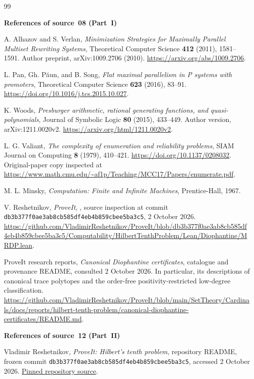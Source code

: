 \documentclass[11pt,letterpaper]{article}
\theoremstyle{definition}
\theoremstyle{remark}
\newcommand{\pin}{\texttt{db3b377f0ae3ab8cb585df4eb4b859cbee5ba3c5}}
\begin{document}
\clearpage
\begin{thebibliography}{99}
\item[]\textbf{References of source~08 (Part~I)}

A. Alhazov and S. Verlan,
\emph{Minimization Strategies for Maximally Parallel Multiset Rewriting
Systems}, Theoretical Computer Science \textbf{412} (2011), 1581--1591.
Author preprint, arXiv:1009.2706 (2010).
\url{https://arxiv.org/abs/1009.2706}.

L. Pan, Gh. P\u{a}un, and B. Song,
\emph{Flat maximal parallelism in P systems with promoters},
Theoretical Computer Science \textbf{623} (2016), 83--91.
\url{https://doi.org/10.1016/j.tcs.2015.10.027}.

K. Woods,
\emph{Presburger arithmetic, rational generating functions, and
quasi-polynomials}, Journal of Symbolic Logic \textbf{80} (2015), 433--449.
Author version, arXiv:1211.0020v2.
\url{https://arxiv.org/html/1211.0020v2}.

L. G. Valiant,
\emph{The complexity of enumeration and reliability problems},
SIAM Journal on Computing \textbf{8} (1979), 410--421.
\url{https://doi.org/10.1137/0208032}.
Original-paper copy inspected at
\url{https://www.math.cmu.edu/~af1p/Teaching/MCC17/Papers/enumerate.pdf}.

M. L. Minsky,
\emph{Computation: Finite and Infinite Machines},
Prentice-Hall, 1967.

V. Reshetnikov, \emph{ProveIt},
,
source inspection at commit
\texttt{db3b377f0ae3ab8cb585df4eb4b859cbee5ba3c5}, 2 October 2026.
\url{https://github.com/VladimirReshetnikov/ProveIt/blob/db3b377f0ae3ab8cb585df4eb4b859cbee5ba3c5/Computability/HilbertTenthProblem/Lean/Diophantine/MRDP.lean}.

ProveIt research reports,
\emph{Canonical Diophantine certificates}, catalogue and provenance
README, consulted 2 October 2026. In particular, its descriptions of
canonical trace polytopes and the order-free positivity-restricted
low-degree classification.
\url{https://github.com/VladimirReshetnikov/ProveIt/blob/main/SetTheory/Cardinals/docs/reports/hilbert-tenth-problem/canonical-diophantine-certificates/README.md}.
\item[]\textbf{References of source~12 (Part~II)}

Vladimir Reshetnikov, \emph{ProveIt: Hilbert's tenth problem}, repository
README, frozen commit \pin, accessed 2 October 2026.
\href{https://github.com/VladimirReshetnikov/ProveIt/blob/db3b377f0ae3ab8cb585df4eb4b859cbee5ba3c5/Computability/HilbertTenthProblem/README.md}{Pinned repository source}.


\end{thebibliography}
\end{document}
